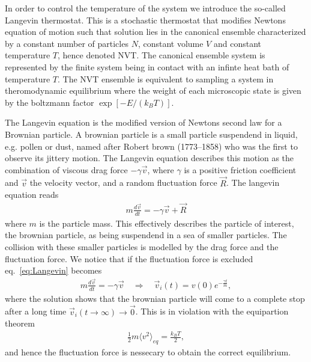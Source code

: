 


In order to control the temperature of the system we introduce the so-called
Langevin thermostat. This is a stochastic thermostat that modifies Newtons
equation of motion such that solution lies in the canonical ensemble
characterized by a constant number of particles $N$, constant volume $V$ and
constant temperature $T$, hence denoted NVT. The canonical ensemble system is
represented by the finite system being in contact with an infinte heat bath of
temperature $T$. The NVT ensemble is equivalent to sampling a system in
theromodynamic equilibrium where the weight of each microscopic state is given
by the boltzmann factor $\exp[-E/(k_B T)]$.

The Langevin equation is the modified version of Newtons second law for a
Brownian particle. A brownian particle is a small particle suspendend in liquid,
e.g. pollen or dust, named after Robert brown (1773–1858) who was the first to
observe its jittery motion. The Langevin equation describes this motion as the
combination of viscous drag force $ -\gamma \vec{v}$, where $\gamma$ is a
positive friction coefficient and $\vec{v}$ the velocity vector, and a random
fluctuation force $\vec{R}$. The langevin equation reads
\begin{align}
  m \frac{d \vec{v}}{dt} = -\gamma \vec{v} + \vec{R}
  \label{eq:Langevin}
\end{align}
where $m$ is the particle mass. This effectively describes the particle of
interest, the brownian particle, as being suspendend in a sea of smaller
particles. The collision with these smaller particles is modelled by the drag
force and the fluctuation force. We notice that if the fluctuation force is
excluded eq.~\eqref{eq:Langevin} becomes 
\begin{align*}
  m \frac{d \vec{v}}{dt} = -\gamma \vec{v} \quad \Rightarrow \quad 
  \vec{v}_i(t) = v(0)e^{- \frac{\gamma t}{m}},
\end{align*}
where the solution shows that the brownian particle will come to a complete stop
after a long time ${\vec{v}_i(t\to\infty) \to \vec{0}}$. This is in violation
with the equipartion theorem
\begin{align*}
  \frac{1}{2}m\langle v^2 \rangle_{eq} = \frac{k_B T}{2},
\end{align*}
and hence the fluctuation force is nessecary to obtain the correct equilibrium. 

